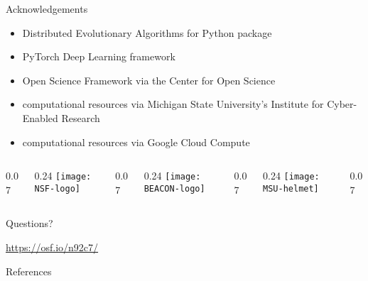 \begin{frame}{Acknowledgements}
\begin{itemize}
\item Distributed Evolutionary Algorithms for Python
package \cite{fortin2012deap}
\item PyTorch Deep Learning framework \cite{paszke2017pytorch}
\item Open Science Framework via the Center for Open Science
\item computational resources via Michigan State University's Institute for Cyber-Enabled Research
\item computational resources via Google Cloud Compute
\end{itemize}

\vfill

\newcommand{\innerspacer}{0.07\textwidth}
\newcommand{\content}{0.24\textwidth}
\newcommand{\outerspacer}{0.07\textwidth}

\begin{center}
 \begin{columns}
	\begin{column}{\outerspacer}~\end{column}
	 \begin{column}{\content}
		\texttt{[image: NSF-logo]}
 	\end{column}
  \begin{column}{\innerspacer}~\end{column}
	 \begin{column}{\content}
		\texttt{[image: BEACON-logo]}
 	\end{column}
  \begin{column}{\innerspacer}~\end{column}
 	\begin{column}{\content}
   \texttt{[image: MSU-helmet]}
 	\end{column}
 	\begin{column}{\outerspacer}~\end{column}
 \end{columns}
\end{center}

\end{frame}


\begin{frame}[standout]

  \vspace{17ex}

  {\Huge
  Questions?
  }
  \vspace{15ex}

  \url{https://osf.io/n92c7/}

\end{frame}

\begin{frame}[allowframebreaks]{References}

  
  
\end{frame}
